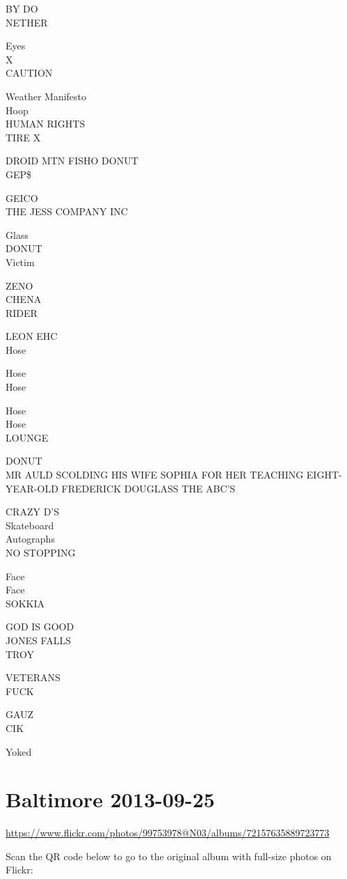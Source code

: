 \documentclass[10pt,letterpaper]{article}
\begin{document}
BY DO\\
NETHER

Eyes\\
X\\
CAUTION

Weather Manifesto\\
Hoop\\
HUMAN RIGHTS\\
TIRE X

DROID MTN FISHO DONUT\\
GEP\$

GEICO\\
THE JESS COMPANY INC

Glass\\
DONUT\\
Victim

ZENO\\
CHENA\\
RIDER

LEON EHC\\
Hose

Hose\\
Hose

Hose\\
Hose\\
LOUNGE

DONUT\\
MR AULD SCOLDING HIS WIFE SOPHIA FOR HER TEACHING EIGHT{-}YEAR{-}OLD FREDERICK DOUGLASS THE ABC'S

CRAZY D'S\\
Skateboard\\
Autographs\\
NO STOPPING

Face\\
Face\\
SOKKIA

GOD IS GOOD\\
JONES FALLS\\
TROY

VETERANS\\
FUCK

GAUZ\\
CIK

Yoked
\pagebreak

\section*{Baltimore 2013-09-25}

\url{https://www.flickr.com/photos/99753978@N03/albums/72157635889723773}

Scan the QR code below to go to the original album with full-size photos on Flickr:
\end{document}
